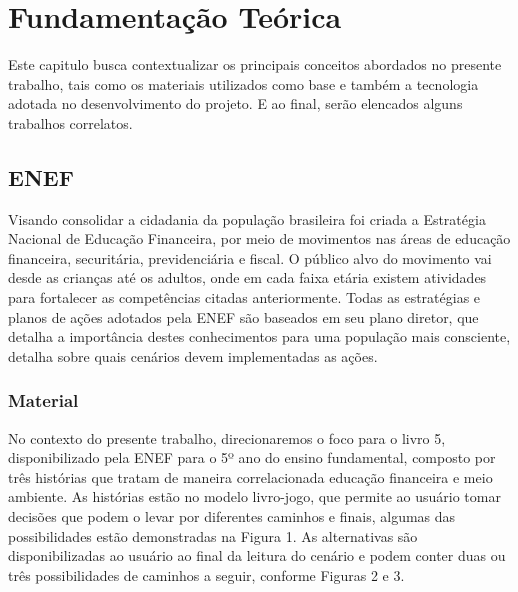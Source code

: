 \chapter{Fundamentação Teórica}
    Este capitulo busca contextualizar os principais conceitos abordados no presente trabalho, tais como os materiais
    utilizados como base e também a tecnologia adotada no desenvolvimento do projeto. E ao final, serão elencados alguns
    trabalhos correlatos.

    \section{ENEF}
        Visando consolidar a cidadania da população brasileira foi criada a Estratégia Nacional de Educação Financeira,
        por meio de movimentos nas áreas de educação financeira, securitária, previdenciária e fiscal. O público alvo do
        movimento vai desde as crianças até os adultos, onde em cada faixa etária existem atividades para fortalecer as
        competências citadas anteriormente. Todas as estratégias e planos de ações adotados pela ENEF são baseados em
        seu plano diretor, que detalha a importância destes conhecimentos para uma população mais consciente, detalha
        sobre quais cenários devem implementadas as ações.

        \subsection{Material}
            No contexto do presente trabalho, direcionaremos o foco para o livro 5, disponibilizado pela ENEF para o 5º
            ano do ensino fundamental, composto por três histórias que tratam de maneira correlacionada educação
            financeira e meio ambiente. As histórias estão no modelo livro-jogo, que permite ao usuário tomar decisões
            que podem o levar por diferentes caminhos e finais, algumas das possibilidades estão demonstradas na Figura 1.
            As alternativas são disponibilizadas ao usuário ao final da leitura do cenário e podem conter duas ou três
            possibilidades de caminhos a seguir, conforme Figuras 2 e 3.

